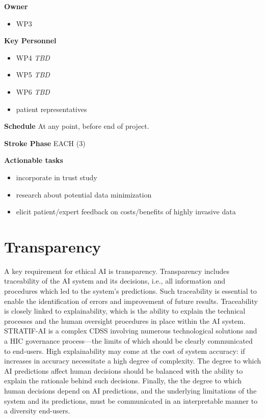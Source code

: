 \documentclass[
  letterpaper,
  DIV=11,
  numbers=noendperiod]{scrreport}
\providecommand{\tightlist}{%
  \setlength{\itemsep}{0pt}\setlength{\parskip}{0pt}}\usepackage{longtable,booktabs,array}
\begin{document}
\textbf{Owner}

\begin{itemize}
\tightlist
\item
  WP3
\end{itemize}

\textbf{Key Personnel}

\begin{itemize}
\tightlist
\item
  WP4 \emph{TBD}
\item
  WP5 \emph{TBD}
\item
  WP6 \emph{TBD}
\item
  patient representatives
\end{itemize}

\textbf{Schedule} At any point, before end of project.

\textbf{Stroke Phase} EACH (3)

\textbf{Actionable tasks}

\begin{itemize}
\tightlist
\item
  incorporate in trust study
\item
  research about potential data minimization
\item
  elicit patient/expert feedback on costs/benefits of highly invasive
  data
\end{itemize}


\hypertarget{transparency}{%
\chapter{Transparency}\label{transparency}}

A key requirement for ethical AI is transparency. Transparency includes
traceability of the AI system and its decisions, i.e., all information
and procedures which led to the system's predictions. Such traceability
is essential to enable the identification of errors and improvement of
future results. Traceability is closely linked to explainability, which
is the ability to explain the technical processes and the human
oversight procedures in place within the AI system. STRATIF-AI is a
complex CDSS involving numerous technological solutions and a HIC
governance process---the limits of which should be clearly communicated
to end-users. High explainability may come at the cost of system
accuracy: if increases in accuracy necessitate a high degree of
complexity. The degree to which AI predictions affect human decisions
should be balanced with the ability to explain the rationale behind such
decisions. Finally, the the degree to which human decisions depend on AI
predictions, and the underlying limitations of the system and its
predictions, must be communicated in an interpretable manner to a
diversity end-users.
\end{document}
